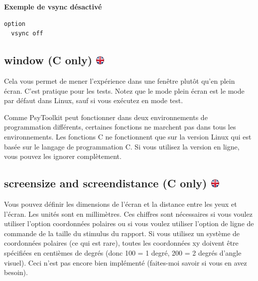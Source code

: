 \documentclass[
]{book}
\begin{document}
\textbf{Exemple de vsync désactivé}

\begin{verbatim}
option
  vsync off
\end{verbatim}

\hypertarget{window-c-only}{%
\subsection[window (C only) ]{\texorpdfstring{window (C only)
\href{https://www.psytoolkit.org/doc3.2.0/syntax.html\#options-window}{\protect\includegraphics{img/ukflag.png}}}{window (C only) }}\label{window-c-only}}

Cela vous permet de mener l'expérience dans une fenêtre plutôt qu'en
plein écran. C'est pratique pour les tests. Notez que le mode plein
écran est le mode par défaut dans Linux, sauf si vous exécutez en mode
test.

Comme PsyToolkit peut fonctionner dans deux environnements de
programmation différents, certaines fonctions ne marchent pas dans tous
les environnements. Les fonctions C ne fonctionnent que sur la version
Linux qui est basée sur le langage de programmation C. Si vous utilisez
la version en ligne, vous pouvez les ignorer complètement.

\hypertarget{screensize-and-screendistance-c-only}{%
\subsection[screensize and screendistance (C only)
]{\texorpdfstring{screensize and screendistance (C only)
\href{https://www.psytoolkit.org/doc3.2.0/syntax.html\#options-screendistance}{\protect\includegraphics{img/ukflag.png}}}{screensize and screendistance (C only) }}\label{screensize-and-screendistance-c-only}}

Vous pouvez définir les dimensions de l'écran et la distance entre les
yeux et l'écran. Les unités sont en millimètres. Ces chiffres sont
nécessaires si vous voulez utiliser l'option coordonnées polaires ou si
vous voulez utiliser l'option de ligne de commande de la taille du
stimulus du rapport. Si vous utilisez un système de coordonnées polaires
(ce qui est rare), toutes les coordonnées xy doivent être spécifiées en
centièmes de degrés (donc 100 = 1 degré, 200 = 2 degrés d'angle visuel).
Ceci n'est pas encore bien implémenté (faites-moi savoir si vous en avez
besoin).
\end{document}
